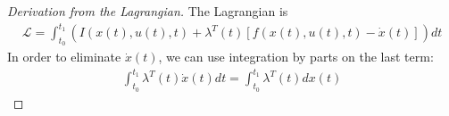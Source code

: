 \documentclass[11pt]{elegantbook}
\begin{document}
\begin{proof}[Derivation from the Lagrangian]
    The Lagrangian is
    \begin{equation}
        \begin{aligned}
            \mathcal{L}=\int_{t_0}^{t_1}\left(I(x(t),u(t),t)+\lambda^T(t)\left[f(x(t),u(t),t)-\dot{x}(t)\right]\right)dt
        \end{aligned}
        \nonumber
    \end{equation}
    In order to eliminate $\dot{x}(t)$, we can use integration by parts on the last term:
    \begin{equation}
        \begin{aligned}
            \int_{t_0}^{t_1}\lambda^T(t)\dot{x}(t)dt=\int_{t_0}^{t_1}\lambda^T(t)dx(t)
        \end{aligned}
        \nonumber
    \end{equation}
\end{proof}
\end{document}
